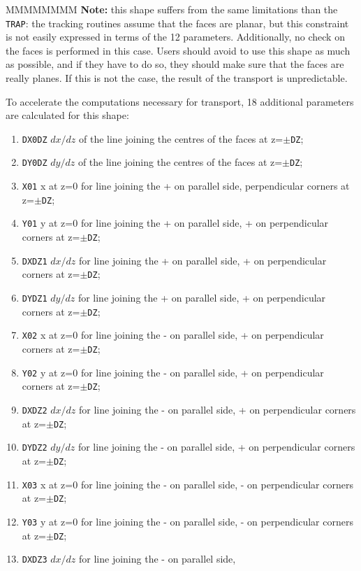 \begin{DLtt}{MMMMMMMM}
{\bf Note:} this shape suffers from the same limitations than the {\tt TRAP}:
the tracking routines assume that the faces are planar, but this constraint
is not easily expressed in terms of the 12 parameters. Additionally, no check
on the faces is performed in this case. Users should avoid to use this shape
as much as possible, and if they have to do so, they should make sure that the
faces are really planes. If this is not the case, the result of the transport
is unpredictable.

To accelerate the computations necessary for transport, 18 additional 
parameters are calculated for this shape:

\begin{enumerate}
\item {\tt DX0DZ} $dx/dz$ of the line joining the centres of the faces at 
z=$\pm${\tt DZ};
\item {\tt DY0DZ} $dy/dz$ of the line joining the centres of the faces at 
z=$\pm${\tt DZ};
\item {\tt X01} x at z=0 for line joining the
+ on parallel side, perpendicular corners at z=$\pm${\tt DZ};
\item {\tt Y01} y at z=0 for line joining the
+ on parallel side, + on perpendicular corners at z=$\pm${\tt DZ};
\item {\tt DXDZ1} $dx/dz$ for line joining the + on parallel side,
+ on perpendicular corners at z=$\pm${\tt DZ};
\item {\tt DYDZ1} $dy/dz$ for line joining the + on parallel side,
+ on perpendicular corners at z=$\pm${\tt DZ};
\item {\tt X02} x at z=0 for line joining the - on parallel side,
+ on perpendicular corners at z=$\pm${\tt DZ};
\item {\tt Y02} y at z=0 for line joining the - on parallel side,
+ on perpendicular corners at z=$\pm${\tt DZ};
\item {\tt DXDZ2} $dx/dz$ for line joining the - on parallel side,
+ on perpendicular corners at z=$\pm${\tt DZ};
\item {\tt DYDZ2} $dy/dz$ for line joining the - on parallel side, 
+ on perpendicular corners at z=$\pm${\tt DZ};
\item {\tt X03} x at z=0 for line joining the - on parallel side,
- on perpendicular corners at z=$\pm${\tt DZ};
\item {\tt Y03} y at z=0 for line joining the - on parallel side,
- on perpendicular corners at z=$\pm${\tt DZ};
\item {\tt DXDZ3} $dx/dz$ for line joining the - on parallel side,

\end{enumerate}
\end{DLtt}
